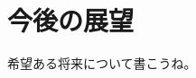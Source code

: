 \documentclass[../../main.tex]{subfiles}
\begin{document}
\chapter{今後の展望}
希望ある将来について書こうね。
\end{document}
